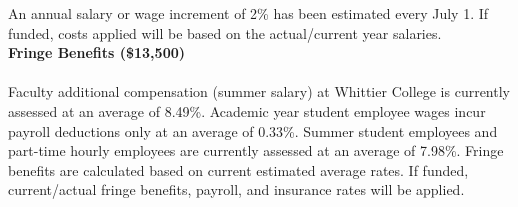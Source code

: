 \documentclass[11pt]{amsart}
\begin{document}
\noindent
An annual salary or wage increment of 2\% has been estimated every July 1. If funded, costs applied will be based on the actual/current year salaries. \\

\noindent
\textbf{Fringe Benefits (\$13,500)} \\ \\
Faculty additional compensation (summer salary) at Whittier College is currently assessed at an average of 8.49\%. Academic year student employee wages incur payroll deductions only at an average of 0.33\%. Summer student employees and part-time hourly employees are currently assessed at an average of 7.98\%. Fringe benefits are calculated based on current estimated average rates. If funded, current/actual fringe benefits, payroll, and insurance rates will be applied. \\
\end{document}
